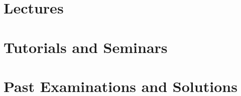 \documentclass{hdnotes}
\begin{document}

\part{Lectures}










\part{Tutorials and Seminars}


\part{Past Examinations and Solutions}

\end{document}

